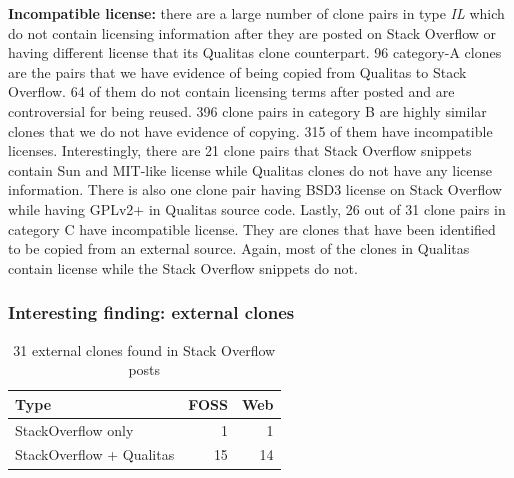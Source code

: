 \documentclass{sig-alternate-05-2015}
\begin{document}
\textbf{Incompatible license:} there are a large number of clone pairs in type \textit{IL} which do not contain licensing information after they are posted on Stack Overflow or having different license that its Qualitas clone counterpart. 96 category-A clones are the pairs that we have evidence of being copied from Qualitas to Stack Overflow. 64 of them do not contain licensing terms after posted and are controversial for being reused. 396 clone pairs in category B are highly similar clones that we do not have evidence of copying. 315 of them have incompatible licenses. Interestingly, there are 21 clone pairs that Stack Overflow snippets contain Sun and MIT-like license while Qualitas clones do not have any license information. There is also one clone pair having BSD3 license on Stack Overflow while having GPLv2+ in Qualitas source code. Lastly, 26 out of 31 clone pairs in category C have incompatible license. They are clones that have been identified to be copied from an external source. Again, most of the clones in Qualitas contain license while the Stack Overflow snippets do not. 

\subsubsection{Interesting finding: external clones}

\begin{table}[]
	\centering
	\caption{31 external clones found in Stack Overflow posts}
	\label{tab:ext_clones}
	\begin{tabular}{l|r|r}
		\hline
		Type        & FOSS & Web \\ \hline
		StackOverflow only     & 1    & 1   \\
		StackOverflow + Qualitas & 15   & 14  \\ \hline
	\end{tabular}
\end{table}
\end{document}
